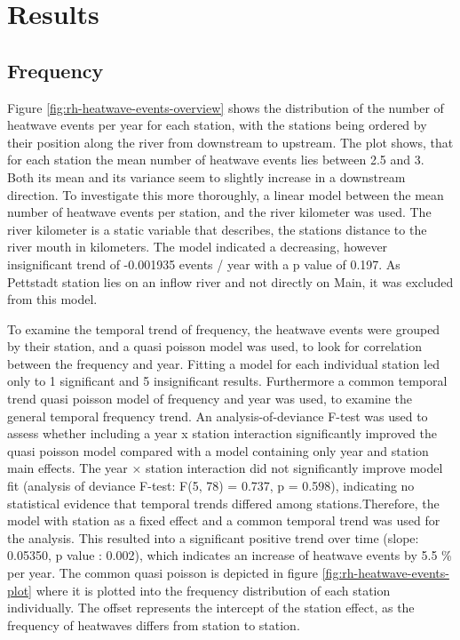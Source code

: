 \documentclass[
]{krantz}
\begin{document}
\section{Results}\label{results-3}

\subsection{Frequency}\label{frequency}

Figure \ref{fig:rh-heatwave-events-overview} shows the distribution of the number of heatwave events per year for each
station, with the stations being ordered by their position along the river from downstream to upstream. The plot shows, that
for each station the mean number of heatwave events lies between 2.5 and 3. Both its mean and its variance seem to
slightly increase in a downstream direction. To investigate this more thoroughly, a linear model between the mean
number of heatwave events per station, and the river kilometer was used. The river kilometer is a static variable that describes, the stations distance to the river mouth in kilometers. The model indicated a decreasing, however insignificant trend of -0.001935 events / year
with a p value of 0.197. As Pettstadt station lies on an inflow river and not directly on Main, it was excluded from
this model.

To examine the temporal trend of frequency, the heatwave events were grouped by their station, and a quasi poisson model
was used, to look for correlation between the frequency and year. Fitting a model for each individual station led only
to 1 significant and 5 insignificant results. Furthermore a common temporal trend quasi poisson model of frequency and
year was used, to examine the general temporal frequency trend. An analysis-of-deviance F-test was used to assess
whether including a year x station interaction significantly improved the quasi poisson model compared with a model
containing only year and station main effects. The year × station interaction did not significantly improve model fit (analysis of deviance F-test: F(5, 78) = 0.737, p = 0.598), indicating no statistical evidence that temporal trends
differed among stations.Therefore, the model with station as a fixed effect and a common temporal trend was used for the
analysis.
This resulted into a significant positive trend over time (slope: 0.05350, p value : 0.002), which indicates an increase
of heatwave events by 5.5 \% per year. The common quasi poisson is depicted in figure \ref{fig:rh-heatwave-events-plot}
where it is plotted into the frequency distribution of each station individually. The offset represents the intercept of
the station effect, as the frequency of heatwaves differs from station to station.
\end{document}
